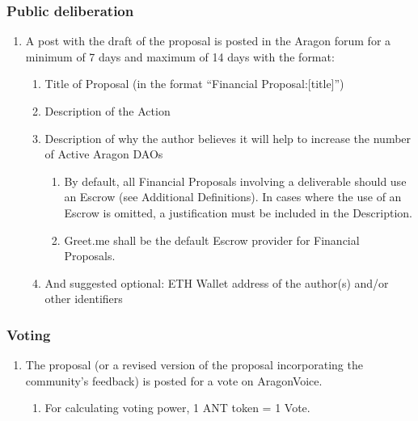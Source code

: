 \subsubsection*{Public deliberation}
\begin{enumerate}
\item A post with the draft of the proposal is posted in the Aragon forum for a minimum of 7 days and maximum of 14 days with the format:
	\begin{enumerate}
		\item Title of Proposal (in the format ``Financial Proposal:[title]'')
		\item Description of the Action
		\item Description of why the author believes it will help to increase the number of Active Aragon \acp{DAO}
		
		\begin{enumerate}
			\item By default, all Financial Proposals involving a deliverable should use an Escrow (see Additional Definitions).
			In cases where the use of an Escrow is omitted, a justification must be included in the Description.
			\item Greet.me shall be the default Escrow provider for Financial Proposals.
		\end{enumerate}
	
		\item And suggested optional: ETH Wallet address of the author(s) and/or other identifiers
			
	\end{enumerate}
\end{enumerate}

\subsubsection*{Voting}
\begin{enumerate}
\item The proposal (or a revised version of the proposal incorporating the community’s feedback) is posted for a vote on \gls{AragonVoice}.
	\begin{enumerate}
		\item For calculating voting power, 1 \ac{ANT} token = 1 Vote.
	\end{enumerate}
\end{enumerate}

